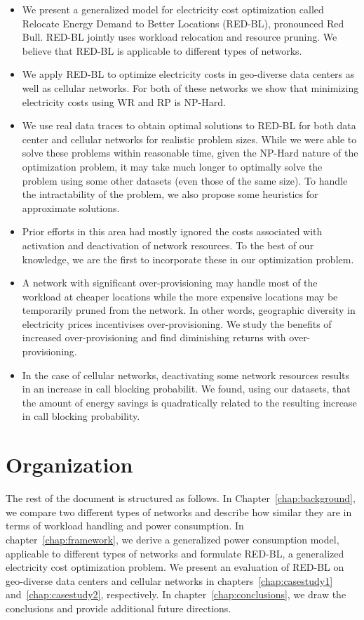 \begin{itemize}
\item We present a generalized model for electricity cost optimization called Relocate Energy Demand to Better Locations (RED-BL), pronounced Red Bull. RED-BL jointly uses workload relocation and resource pruning. We believe that RED-BL is applicable to different types of networks. 
\item %
We apply RED-BL to optimize electricity costs in geo-diverse data centers as well as cellular networks. For both of these networks we show that minimizing electricity costs using WR and RP is NP-Hard.
\item We use real data traces to obtain optimal solutions to RED-BL for both data center and cellular networks for realistic problem sizes. While we were able to solve these problems within reasonable time, given the NP-Hard nature of the optimization problem, it may take much longer to optimally solve the problem using some other datasets (even those of the same size). To handle the intractability of the problem, we also propose some heuristics for approximate solutions. 
\item Prior efforts in this area had mostly ignored the costs associated with activation and deactivation of network resources. To the best of our knowledge, we are the first to incorporate these in our optimization problem.
\item A network with significant over-provisioning may handle most of the workload at cheaper locations while the more expensive locations may be temporarily pruned from the network. In other words, geographic diversity in electricity prices incentivises over-provisioning. We study the benefits of increased over-provisioning and find diminishing returns with over-provisioning.
\item In the case of cellular networks, deactivating some network resources results in an increase in call blocking probabilit. We found, using our datasets, that the amount of energy savings is quadratically related to the resulting increase in call blocking probability.
\end{itemize}

\section{Organization} The rest of the document is structured as follows. In Chapter~\ref{chap:background}, we compare two different types of networks and describe how similar they are in terms of workload handling and power consumption. In chapter~\ref{chap:framework}, we derive a generalized power consumption model, applicable to different types of networks and formulate RED-BL, a generalized electricity cost optimization problem. We present an evaluation of RED-BL on geo-diverse data centers and cellular networks in chapters~\ref{chap:casestudy1} and~\ref{chap:casestudy2}, respectively. In chapter~\ref{chap:conclusions}, we draw the conclusions and provide additional future directions.